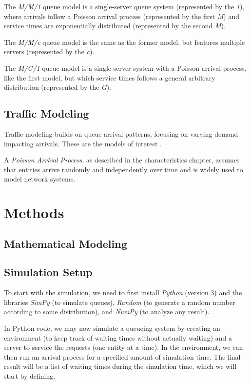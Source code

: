 \documentclass[a4paper,12pt]{article}
\begin{document}
        The \textit{M/M/1} queue model is a single-server queue system (represented by the \textit{1}), where arrivals follow a Poisson arrival process (represented by the first \textit{M}) and service times are exponentially distributed (represented by the second \textit{M}). 
        
        The \textit{M/M/c} queue model is the same as the former model, but features multiple servers (represented by the \textit{c}).
        
        The \textit{M/G/1} queue model is a single-server system with a Poisson arrival process, like the first model, but which service times follows a general arbitrary distribution (represented by the \textit{G}).
    
    \subsection{Traffic Modeling}
    Traffic modeling builds on queue arrival patterns, focusing on varying demand impacting arrivals. These are the models of interest \cite{ross2022}.

    A \textit{Poisson Arrival Process}, as described in the characteristics chapter, assumes that entities arrive randomly and independently over time and is widely used to model network systems.

\section{Methods}

    \subsection{Mathematical Modeling}
    
    \subsection{Simulation Setup}
    To start with the simulation, we need to first install \textit{Python} (version 3) and the libraries \textit{SimPy} (to simulate queues), \textit{Random} (to generate a random number according to some distribution), and \textit{NumPy} (to analyze any result).

    In Python code, we may now simulate a queueing system by creating an environment (to keep track of waiting times without actually waiting) and a server to service the requests (one entity at a time). In the environment, we can then run an arrival process for a specified amount of simulation time. The final result will be a list of waiting times during the simulation time, which we will start by defining.
\end{document}
